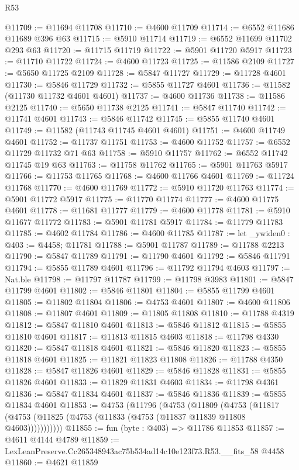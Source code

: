 \begin{lexlean}{R53}
\begin{coremodule}
@11709 := @11694 @11708
@11710 := @4600 @11709
@11714 := @6552 @11686 @11689 @396 @63
@11715 := @5910 @11714
@11719 := @6552 @11699 @11702 @293 @63
@11720 := @11715 @11719
@11722 := @5901 @11720 @5917
@11723 := @11710 @11722
@11724 := @4600 @11723
@11725 := @11586 @2109
@11727 := @5650 @11725 @2109
@11728 := @5847 @11727
@11729 := @11728 @4601
@11730 := @5846 @11729
@11732 := @5855 @11727 @4601
@11736 := @11582 (@11730 @11732 @4601 @4601)
@11737 := @4600 @11736
@11738 := @11586 @2125
@11740 := @5650 @11738 @2125
@11741 := @5847 @11740
@11742 := @11741 @4601
@11743 := @5846 @11742
@11745 := @5855 @11740 @4601
@11749 := @11582 (@11743 @11745 @4601 @4601)
@11751 := @4600 @11749 @4601
@11752 := @11737 @11751
@11753 := @4600 @11752
@11757 := @6552 @11729 @11732 @71 @63
@11758 := @5910 @11757
@11762 := @6552 @11742 @11745 @19 @63
@11763 := @11758 @11762
@11765 := @5901 @11763 @5917
@11766 := @11753 @11765
@11768 := @4600 @11766 @4601
@11769 := @11724 @11768
@11770 := @4600 @11769
@11772 := @5910 @11720 @11763
@11774 := @5901 @11772 @5917
@11775 := @11770 @11774
@11777 := @4600 @11775 @4601
@11778 := @11681 @11777
@11779 := @4600 @11778
@11781 := @5910 @11677 @11772
@11783 := @5901 @11781 @5917
@11784 := @11779 @11783
@11785 := @4602 @11784
@11786 := @4600 @11785
@11787 := let _ywiden0 : @403 := @4458; @11781
@11788 := @5901 @11787
@11789 := @11788 @2213
@11790 := @5847 @11789
@11791 := @11790 @4601
@11792 := @5846 @11791
@11794 := @5855 @11789 @4601
@11796 := @11792 @11794 @4603
@11797 := Nat.ble
@11798 := @11797 @11787
@11799 := @11798 @3983
@11801 := @5847 @11799 @4601
@11802 := @5846 @11801
@11804 := @5855 @11799 @4601
@11805 := @11802 @11804
@11806 := @4753 @4601
@11807 := @4600 @11806
@11808 := @11807 @4601
@11809 := @11805 @11808
@11810 := @11788 @4319
@11812 := @5847 @11810 @4601
@11813 := @5846 @11812
@11815 := @5855 @11810 @4601
@11817 := @11813 @11815 @4603
@11818 := @11798 @4330
@11820 := @5847 @11818 @4601
@11821 := @5846 @11820
@11823 := @5855 @11818 @4601
@11825 := @11821 @11823 @11808
@11826 := @11788 @4350
@11828 := @5847 @11826 @4601
@11829 := @5846 @11828
@11831 := @5855 @11826 @4601
@11833 := @11829 @11831 @4603
@11834 := @11798 @4361
@11836 := @5847 @11834 @4601
@11837 := @5846 @11836
@11839 := @5855 @11834 @4601
@11853 := @4753
    (@11796
      (@4753
        (@11809
          (@4753 (@11817 (@4753 (@11825 (@4753 (@11833 (@4753 (@11837 @11839 @11808 @4603)))))))))))
@11855 := fun (byte : @403) => @11786 @11853
@11857 := @4611 @4144 @4789
@11859 := LexLeanPreserve.Cc265348943ac75b534ad14c10e123f73.R53.__fits_58 @4458
@11860 := @4621 @11859

\end{coremodule}
\end{lexlean}
